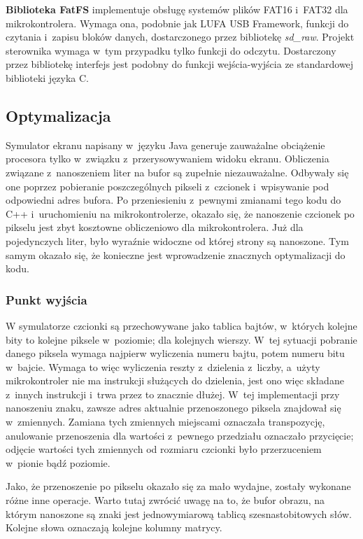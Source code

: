 \textbf{Biblioteka FatFS} implementuje obsługę systemów plików FAT16 i~FAT32 dla mikrokontrolera. Wymaga ona, podobnie jak LUFA USB Framework, funkcji do czytania i~zapisu bloków danych, dostarczonego przez bibliotekę \textit{sd\_raw}. Projekt sterownika wymaga w~tym przypadku tylko funkcji do odczytu. Dostarczony przez bibliotekę interfejs jest podobny do funkcji wejścia-wyjścia ze standardowej biblioteki języka C.

\subsection{Optymalizacja}

Symulator ekranu napisany w~języku Java generuje zauważalne obciążenie procesora tylko w~związku z~przerysowywaniem widoku ekranu. Obliczenia związane z~nanoszeniem liter na bufor są zupełnie niezauważalne. Odbywały się one poprzez pobieranie poszczególnych pikseli z~czcionek i~wpisywanie pod odpowiedni adres bufora. Po przeniesieniu z~pewnymi zmianami tego kodu do C++ i~uruchomieniu na mikrokontrolerze, okazało się, że nanoszenie czcionek po pikselu jest zbyt kosztowne obliczeniowo dla mikrokontrolera. Już dla pojedynczych liter, było wyraźnie widoczne od której strony są nanoszone. Tym samym okazało się, że konieczne jest wprowadzenie znacznych optymalizacji do kodu.

\subsubsection*{Punkt wyjścia}
W symulatorze czcionki są przechowywane jako tablica bajtów, w~których kolejne bity to kolejne piksele w~poziomie; dla kolejnych wierszy. W~tej sytuacji pobranie danego piksela wymaga najpierw wyliczenia numeru bajtu, potem numeru bitu w~bajcie. Wymaga to więc wyliczenia reszty z~dzielenia z~liczby, a~użyty mikrokontroler nie ma instrukcji służących do dzielenia, jest ono więc składane z~innych instrukcji i~trwa przez to znacznie dłużej. W~tej implementacji przy nanoszeniu znaku, zawsze adres aktualnie przenoszonego piksela znajdował się w~zmiennych. Zamiana tych zmiennych miejscami oznaczała transpozycję, anulowanie przenoszenia dla wartości z~pewnego przedziału oznaczało przycięcie; odjęcie wartości tych zmiennych od rozmiaru czcionki było przerzuceniem w~pionie bądź poziomie.

Jako, że przenoszenie po pikselu okazało się za mało wydajne, zostały wykonane różne inne operacje. Warto tutaj zwrócić uwagę na to, że bufor obrazu, na którym nanoszone są znaki jest jednowymiarową tablicą szesnastobitowych słów. Kolejne słowa oznaczają kolejne kolumny matrycy.


